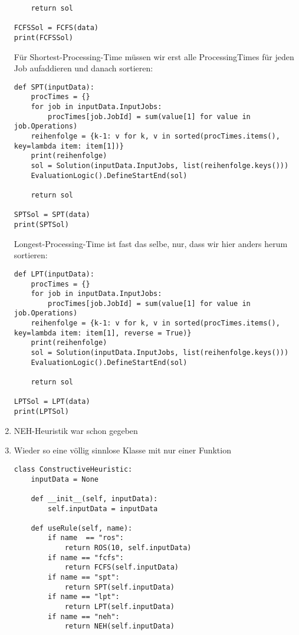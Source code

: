 \documentclass{article}
\begin{document}
\begin{enumerate}[label=(\alph*)]
\begin{lstlisting}
	return sol

FCFSSol = FCFS(data)
print(FCFSSol)
		\end{lstlisting}
		Für Shortest-Processing-Time müssen wir erst alle ProcessingTimes für jeden Job aufaddieren und danach sortieren:
		\begin{lstlisting}
def SPT(inputData):
	procTimes = {}
	for job in inputData.InputJobs:
		procTimes[job.JobId] = sum(value[1] for value in job.Operations)
	reihenfolge = {k-1: v for k, v in sorted(procTimes.items(), key=lambda item: item[1])}
	print(reihenfolge)
	sol = Solution(inputData.InputJobs, list(reihenfolge.keys()))
	EvaluationLogic().DefineStartEnd(sol)

	return sol

SPTSol = SPT(data)
print(SPTSol)
		\end{lstlisting}
		Longest-Processing-Time ist fast das selbe, nur, dass wir hier anders herum sortieren:
		\begin{lstlisting}
def LPT(inputData):
	procTimes = {}
	for job in inputData.InputJobs:
		procTimes[job.JobId] = sum(value[1] for value in job.Operations)
	reihenfolge = {k-1: v for k, v in sorted(procTimes.items(), key=lambda item: item[1], reverse = True)}
	print(reihenfolge)
	sol = Solution(inputData.InputJobs, list(reihenfolge.keys()))
	EvaluationLogic().DefineStartEnd(sol)

	return sol

LPTSol = LPT(data)
print(LPTSol)
		\end{lstlisting}
		\item NEH-Heuristik war schon gegeben
		\item Wieder so eine völlig sinnlose Klasse mit nur einer Funktion
		\begin{lstlisting}
class ConstructiveHeuristic:
	inputData = None

	def __init__(self, inputData):
		self.inputData = inputData

	def useRule(self, name):
		if name  == "ros":
			return ROS(10, self.inputData)
		if name == "fcfs":
			return FCFS(self.inputData)
		if name == "spt":
			return SPT(self.inputData)
		if name == "lpt":
			return LPT(self.inputData)
		if name == "neh":
			return NEH(self.inputData)
		\end{lstlisting}
	\end{enumerate}
\end{document}
